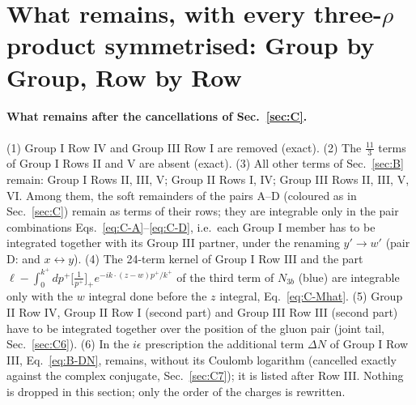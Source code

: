 \section{What remains, with every three-$\rho$ product symmetrised: Group by Group, Row by Row}\label{sec:D}
\paragraph{What remains after the cancellations of Sec.~\ref{sec:C}.} (1) Group I Row IV and Group III Row I are removed (exact). (2) The $\frac{11}{3}$ terms of Group I Rows II and V are absent (exact). (3) All other terms of Sec.~\ref{sec:B} remain: Group I Rows II, III, V; Group II Rows I, IV; Group III Rows II, III, V, VI. Among them, the soft remainders of the pairs A--D (coloured as in Sec.~\ref{sec:C}) remain as terms of their rows; they are integrable only in the pair combinations Eqs.~\eqref{eq:C-A}--\eqref{eq:C-D}, i.e.\ each Group I member has to be integrated together with its Group III partner, under the renaming $y'\to w'$ (pair D: and $x\leftrightarrow y$). (4) The 24-term kernel of Group I Row III and the part $\ell-\int_{0}^{k^{+}}dp^{+}\big[\frac{1}{p^{+}}\big]_{+}e^{-ik\cdot(z-w)p^{+}/k^{+}}$ of the third term of $N_{3b}$ (blue) are integrable only with the $w$ integral done before the $z$ integral, Eq.~\eqref{eq:C-Mhat}. (5) Group II Row IV, Group II Row I (second part) and Group III Row III (second part) have to be integrated together over the position of the gluon pair (joint tail, Sec.~\ref{sec:C6}). (6) In the $i\epsilon$ prescription the additional term $\Delta N$ of Group I Row III, Eq.~\eqref{eq:B-DN}, remains, without its Coulomb logarithm (cancelled exactly against the complex conjugate, Sec.~\ref{sec:C7}); it is listed after Row III. Nothing is dropped in this section; only the order of the charges is rewritten.

